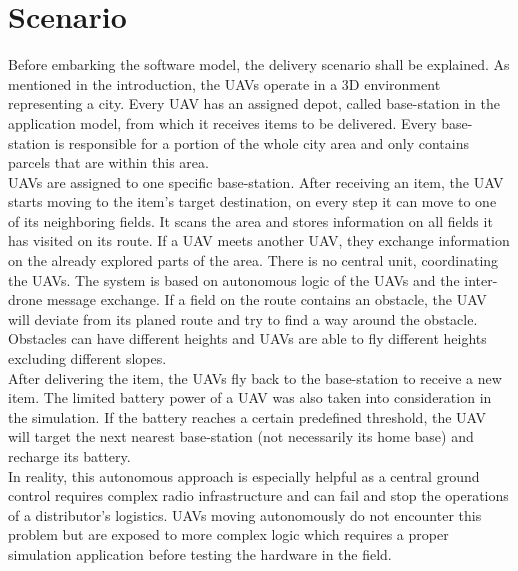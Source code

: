 \section{Scenario}\label{sec:scenario}
Before embarking the software model, the delivery scenario shall be explained. As mentioned in the introduction, the UAVs operate in a 3D environment representing a city. Every UAV has an assigned depot, called base-station in the application model, from which it receives items to be delivered. Every base-station is responsible for a portion of the whole city area and only contains parcels that are within this area. \\
 UAVs are assigned to one specific base-station. After receiving an item, the UAV starts moving to the item’s target destination, on every step it can move to one of its neighboring fields. It scans the area and stores information on all fields it has visited on its route. If a UAV meets another UAV, they exchange information on the already explored parts of the area. There is no central unit, coordinating the UAVs. The system is based on autonomous logic of the UAVs and the inter-drone message exchange. If a field on the route contains an obstacle, the UAV will deviate from its planed route and try to find a way around the obstacle. Obstacles can have different heights and UAVs are able to fly different heights excluding different slopes. \\
After delivering the item, the UAVs fly back to the base-station to receive a new item. The limited battery power of a UAV was also taken into consideration in the simulation. If the battery reaches a certain predefined threshold, the UAV will target the next nearest base-station (not necessarily its home base) and recharge its battery.\\
In reality, this autonomous approach is especially helpful as a central ground control requires complex radio infrastructure and can fail and stop the operations of a distributor's logistics.  UAVs moving autonomously do not encounter this problem but are exposed to more complex logic which requires a proper simulation application before testing the hardware in the field.

